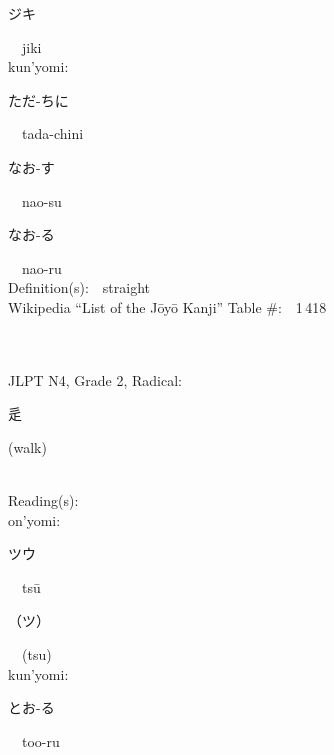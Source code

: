 \begin{multicols}{2}
{\hspace*{2em}}{\begin{CJK}{UTF8}{min} ジキ \end{CJK}}\ \ jiki\ \ \\
{\hspace*{1em}}kun'yomi:\ \ \\
{\hspace*{2em}}{\begin{CJK}{UTF8}{min} ただ-ちに \end{CJK}}\ \ tada-chini\ \ \\
{\hspace*{2em}}{\begin{CJK}{UTF8}{min} なお-す \end{CJK}}\ \ nao-su\ \ \\
{\hspace*{2em}}{\begin{CJK}{UTF8}{min} なお-る \end{CJK}}\ \ nao-ru\ \ \\
Definition(s):\ \ straight \\
Wikipedia ``List of the J\=oy\=o Kanji'' Table \#:\ \ 1\,418 \\
\ \ \\
{\fontsize{34pt}{40pt}  }\ \ \\  %
{JLPT N4, Grade 2, Radical:\ \ {\begin{CJK}{UTF8}{min} 辵 \end{CJK}} (walk) } \\
Reading(s):\ \ \\
{\hspace*{1em}}on'yomi:\ \ \\
{\hspace*{2em}}{\begin{CJK}{UTF8}{min} ツウ \end{CJK}}\ \ ts\=u\ \ \\
{\hspace*{2em}}{\begin{CJK}{UTF8}{min} （ツ） \end{CJK}}\ \ (tsu)\ \ \\
{\hspace*{1em}}kun'yomi:\ \ \\
{\hspace*{2em}}{\begin{CJK}{UTF8}{min} とお-る \end{CJK}}\ \ too-ru\ \ \\

\end{multicols}
